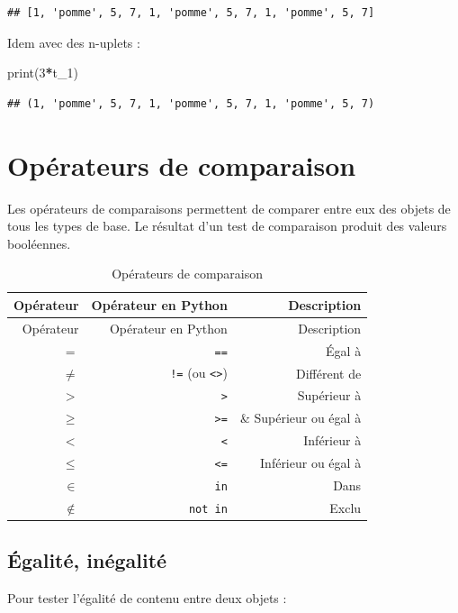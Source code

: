 \documentclass[12pt,]{book}
\newenvironment{Shaded}{\begin{snugshade}}{\end{snugshade}}
\newcommand{\DecValTok}[1]{\textcolor[rgb]{0.00,0.00,0.81}{#1}}
\newcommand{\OperatorTok}[1]{\textcolor[rgb]{0.81,0.36,0.00}{\textbf{#1}}}
\newcommand{\BuiltInTok}[1]{#1}
\newcommand{\NormalTok}[1]{#1}
\numberwithin{equation}{section}
\numberwithin{countremarque}{section}
\begin{document}
\begin{lstlisting}
## [1, 'pomme', 5, 7, 1, 'pomme', 5, 7, 1, 'pomme', 5, 7]
\end{lstlisting}

Idem avec des n-uplets :

\begin{Shaded}
\begin{Highlighting}[]
\BuiltInTok{print}\NormalTok{(}\DecValTok{3}\OperatorTok{*}\NormalTok{t_1)}
\end{Highlighting}
\end{Shaded}

\begin{lstlisting}
## (1, 'pomme', 5, 7, 1, 'pomme', 5, 7, 1, 'pomme', 5, 7)
\end{lstlisting}

\section{Opérateurs de comparaison}\label{operateurs-comparaison}

Les opérateurs de comparaisons permettent de comparer entre eux des
objets de tous les types de base. Le résultat d'un test de comparaison
produit des valeurs booléennes.

\begin{longtable}[]{@{}rrr@{}}
\caption{\label{tab:operateurs-comparaison} Opérateurs de
comparaison}\tabularnewline
\toprule
Opérateur & Opérateur en Python & Description\tabularnewline
\midrule
\endfirsthead
\toprule
Opérateur & Opérateur en Python & Description\tabularnewline
\midrule
\endhead
\(=\) & \texttt{==} & Égal à\tabularnewline
\(\ne\) & \texttt{!=} (ou \texttt{\textless{}\textgreater{}}) &
Différent de\tabularnewline
\(>\) & \texttt{\textgreater{}} & Supérieur à\tabularnewline
\(\geq\) & \texttt{\textgreater{}=} & \& Supérieur ou égal
à\tabularnewline
\(<\) & \texttt{\textless{}} & Inférieur à\tabularnewline
\(\leq\) & \texttt{\textless{}=} & Inférieur ou égal à\tabularnewline
\(\in\) & \texttt{in} & Dans\tabularnewline
\(\notin\) & \texttt{not\ in} & Exclu\tabularnewline
\bottomrule
\end{longtable}

\subsection{Égalité, inégalité}\label{egalite-inegalite}

Pour tester l'égalité de contenu entre deux objets :
\end{document}
